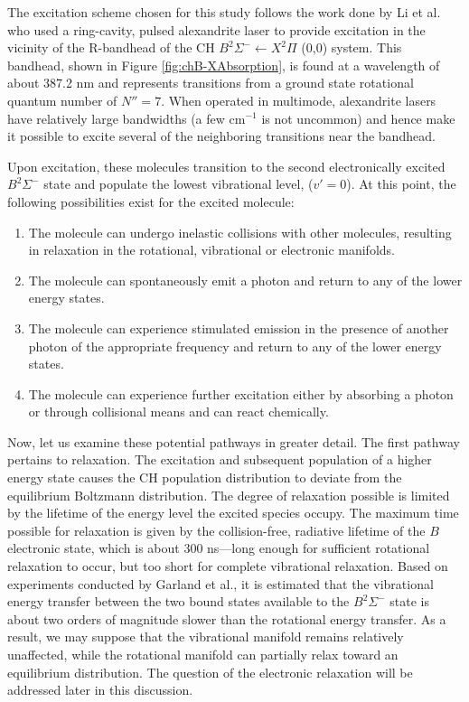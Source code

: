 The excitation scheme chosen for this study follows the work done by Li et al.\cite{2007-li-a} who used a ring-cavity, pulsed alexandrite laser to provide excitation in the vicinity of the R-bandhead of the CH \(B^2\Sigma^- \leftarrow X^2\Pi\) (0,0) system.
This bandhead, shown in Figure \ref{fig:chB-XAbsorption}, is found at a wavelength of about 387.2 nm and represents transitions from a ground state rotational quantum number of \(N''=7\).
When operated in multimode, alexandrite lasers have relatively large bandwidths (a few cm\(^{-1}\) is not uncommon) and hence make it possible to excite several of the neighboring transitions near the bandhead.



Upon excitation, these molecules transition to the second electronically excited \(B^2\Sigma^-\) state and populate the lowest vibrational level, (\(v'=0\)).
At this point, the following possibilities exist for the excited molecule:

\begin{enumerate}
  \item The molecule can undergo inelastic collisions with other molecules, resulting in relaxation in the rotational, vibrational or electronic manifolds.
  \item The molecule can spontaneously emit a photon and return to any of the lower energy states.
  \item The molecule can experience stimulated emission in the presence of another photon of the appropriate frequency and return to any of the lower energy states.
  \item The molecule can experience further excitation either by absorbing a photon or through collisional means and can react chemically.
\end{enumerate}

Now, let us examine these potential pathways in greater detail.
The first pathway pertains to relaxation.
The excitation and subsequent population of a higher energy state causes the CH population distribution to deviate from the equilibrium Boltzmann distribution.
The degree of relaxation possible is limited by the lifetime of the energy level the excited species occupy. 
The maximum time possible for relaxation is given by the collision-free, radiative lifetime of the \(B\) electronic state, which is about 300 ns\cite{1996-luque-c}---long enough for sufficient rotational relaxation to occur, but too short for complete vibrational relaxation.
Based on experiments conducted by Garland et al.\cite{1985-garland-b}, it is estimated that the vibrational energy transfer between the two bound states available to the \(B^2\Sigma^-\) state is about two orders of magnitude slower than the rotational energy transfer.
As a result, we may suppose that the vibrational manifold remains relatively unaffected, while the rotational manifold can partially relax toward an equilibrium distribution.
The question of the electronic relaxation will be addressed later in this discussion.

